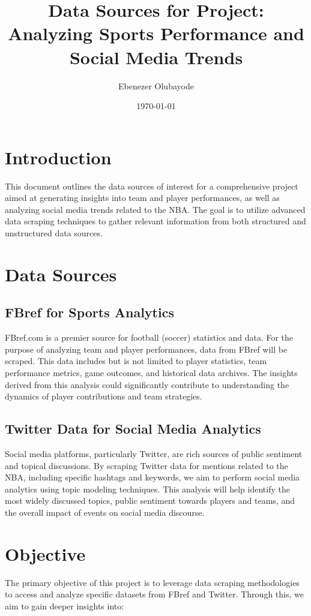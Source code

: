 \documentclass[12pt]{article}
\title{Data Sources for Project: Analyzing Sports Performance and Social Media Trends}
\author{Ebenezer Olubayode}
\date{\today}
\begin{document}
\maketitle

\section{Introduction}
This document outlines the data sources of interest for a comprehensive project aimed at generating insights into team and player performances, as well as analyzing social media trends related to the NBA. The goal is to utilize advanced data scraping techniques to gather relevant information from both structured and unstructured data sources.

\section{Data Sources}

\subsection{FBref for Sports Analytics}
FBref.com is a premier source for football (soccer) statistics and data. For the purpose of analyzing team and player performances, data from FBref will be scraped. This data includes but is not limited to player statistics, team performance metrics, game outcomes, and historical data archives. The insights derived from this analysis could significantly contribute to understanding the dynamics of player contributions and team strategies.

\subsection{Twitter Data for Social Media Analytics}
Social media platforms, particularly Twitter, are rich sources of public sentiment and topical discussions. By scraping Twitter data for mentions related to the NBA, including specific hashtags and keywords, we aim to perform social media analytics using topic modeling techniques. This analysis will help identify the most widely discussed topics, public sentiment towards players and teams, and the overall impact of events on social media discourse.

\section{Objective}
The primary objective of this project is to leverage data scraping methodologies to access and analyze specific datasets from FBref and Twitter. Through this, we aim to gain deeper insights into:
\end{document}
